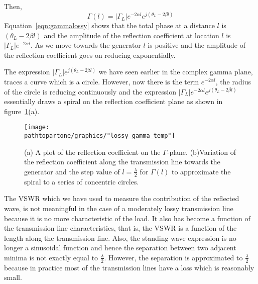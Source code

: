 Then,
\begin{dmath}
\Gamma{(l)} = |\Gamma_L|e^{-2\alpha l}e^{j(\theta_L-2\beta l)}
\label{eqn:gammalossy}
\end{dmath}
Equation~\eqref{eqn:gammalossy} shows that the total phase at a distance $l$ is $(\theta_L - 2\beta l)$ and the amplitude of the reflection coefficient at location $l$ is $|\Gamma_L|e^{-2\alpha l}$. As we move towards the generator $l$ is positive and the amplitude of the reflection coefficient goes on reducing exponentially.

The expression $|\Gamma_L|e^{j(\theta_L-2\beta l)}$ we have seen earlier in the complex gamma plane, traces a curve which is a circle. However, now there is the term $e^{-2\alpha l}$, the radius of the circle is reducing continuously and the expression $|\Gamma_L|e^{-2\alpha l}e^{j(\theta_L - 2\beta l)}$ essentially draws a spiral on the reflection coefficient plane as shown in figure~\ref{fig:lossygamma}(a).
\begin{figure}[h]
\centering
\texttt{[image: \\pathtopartone/graphics/"lossy\_gamma\_temp"]}
\caption{(a) A plot of the reflection coefficient on the $\Gamma$-plane. (b)Variation of the reflection coefficient along the transmission line towards the generator and the step value of $l = \frac{\lambda}{2}$ for $\Gamma(l)$ to approximate the spiral to a series of concentric circles.}
\label{fig:lossygamma}
\end{figure}

The VSWR which we have used to measure the contribution of the reflected wave, is not meaningful in the case of a moderately lossy transmission line because it is no more characteristic of the load. It also has become a function of the transmission line characteristics, that is, the VSWR is a function of the length along the transmission line. Also, the standing wave expression is no longer a sinusoidal function and hence the separation between two adjacent minima is not exactly equal to $\frac{\lambda}{2}$. However, the separation is approximated to $\frac{\lambda}{2}$ because in practice most of the transmission lines have a loss which is reasonably small.

